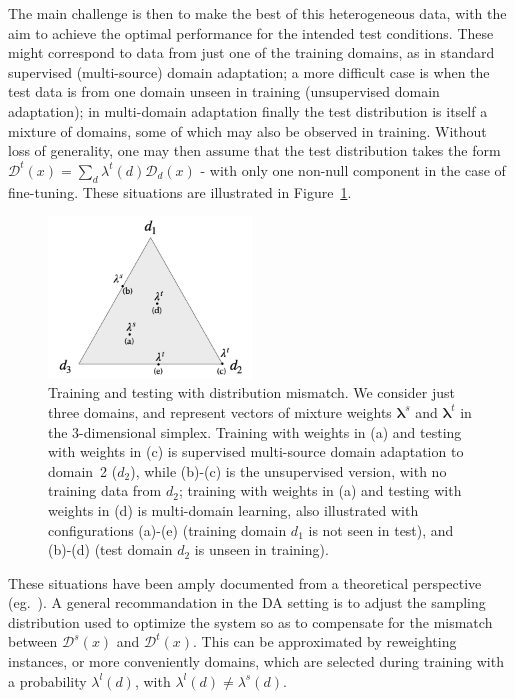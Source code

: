 \documentclass[11pt,a4paper]{article}
\newcommand{\vlambda}{\ensuremath{\boldsymbol\lambda}\xspace} %
\begin{document}
The main challenge is then to make the best of this heterogeneous data, with the aim to achieve the optimal performance for the intended test conditions. These might correspond to data from just one of the training domains, as in standard supervised (multi-source) domain adaptation; a more difficult case is when the test data is from one domain unseen in training (unsupervised domain adaptation); in multi-domain adaptation finally the test distribution is itself a mixture of domains, some of which may also be observed in training.  Without loss of generality, one may then assume that the test distribution takes the form $\mathcal{D}^{t}(x) = \sum_d \lambda^{t}(d) \mathcal{D}_d(x)$ - with only one non-null  component in the case of fine-tuning.
These situations are illustrated in Figure~\ref{fig:mdmt-lambdas}.
\begin{figure}[h]
  \centering
  \includegraphics[width=0.48\textwidth]{mdmt-lambdas}
  \caption{Training and testing with distribution mismatch. We consider just three domains, and represent vectors of mixture weights $\vlambda^{s}$ and $\vlambda^{t}$ in the 3-dimensional simplex. Training with weights in (a) and testing with weights in (c) is supervised multi-source domain adaptation to domain~2 ($d_2$), while (b)-(c) is the unsupervised version, with no training data from $d_2$; training with weights in (a) and testing with weights in (d) is multi-domain learning, also illustrated with configurations (a)-(e) (training domain $d_1$ is not seen in test), and (b)-(d)  (test domain $d_2$ is unseen in training).}\label{fig:mdmt-lambdas}
\end{figure}

These situations have been amply documented from a theoretical perspective (eg.\ \cite{Mansour09multiple,Mansour09domainadaptation,Hoffman18algorithms}). A general recommandation in the DA setting  is to adjust the sampling distribution used to optimize the system so as to compensate for the mismatch between $\mathcal{D}^s(x)$ and $\mathcal{D}^t(x)$. This can be approximated by reweighting instances, or more conveniently domains, which are selected during training with a probability $\lambda^{l}(d)$, with $\lambda^{l}(d) \neq \lambda^{s}(d)$.
\end{document}
